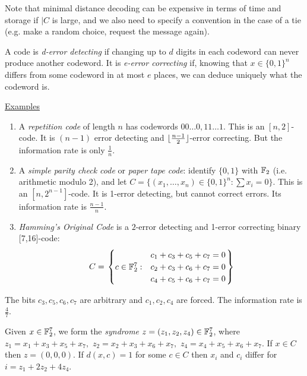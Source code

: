 \documentclass[10pt,a4paper]{article}
\begin{document}
Note that minimal distance decoding can be expensive in terms of time and storage if $|C$ is large, and we also need to specify a convention in the case of a tie (e.g. make a random choice, request the message again).

A code is \emph{d-error detecting} if changing up to $d$ digits in each codeword can never produce another codeword. It is \emph{e-error correcting} if, knowing that $x \in \{0,1\}^n$ differs from some codeword in at most $e$ places, we can deduce uniquely what the codeword is.

\hspace*{-1em}\underline{Examples}
\begin{enumerate}
\item A \emph{repetition code} of length $n$ has codewords $00\ldots0, 11\ldots1$. This is an $[n,2]$-code. It is $(n-1)$ error detecting and $\lfloor \frac{n-1}{2} \rfloor$-error correcting. But the information rate is only $\frac1n$.
\item A \emph{simple parity check code} or \emph{paper tape code}: identify $\{0,1\}$ with $\mathbb{F}_2$ (i.e. arithmetic modulo 2), and let $C = \{(x_1,\ldots, x_n)\in \{0,1\}^n : \sum x_i = 0\}$. This is an $[n, 2^{n-1}]$-code. It is 1-error detecting, but cannot correct errors. Its information rate is $\frac{n-1}{n}$.
\item \emph{Hamming's Original Code} is a $2$-error detecting and 1-error correcting binary [7,16]-code:
\begin{align*}
C = \left.\begin{cases} & c_1+c_3+c_5+c_7 = 0\\ c \in \mathbb{F}_2^7 : & c_2+c_3+c_6+c_7 = 0\\ &c_4+c_5+c_6+c_7 = 0\end{cases}\right\}
\end{align*}
\end{enumerate}
The bits $c_3,c_5,c_6,c_7$ are arbitrary and $c_1, c_2, c_4$ are forced. The information rate is $\frac47$.

Given $x \in \mathbb{F}_2^7$, we form the \emph{syndrome} $z = (z_1,z_2,z_4) \in \mathbb{F}_2^7$, where $z_1 = x_1+x_3+x_5+x_7,$ $z_2 = x_2+x_3+x_6+x_7,$ $z_4 = x_4+x_5+x_6+x_7$. If $x \in C$ then $z = (0,0,0)$. If $d(x,c) = 1$ for some $c \in C$ then $x_i$ and $c_i$ differ for $i = z_1 + 2z_2 + 4z_4$.
\end{document}

